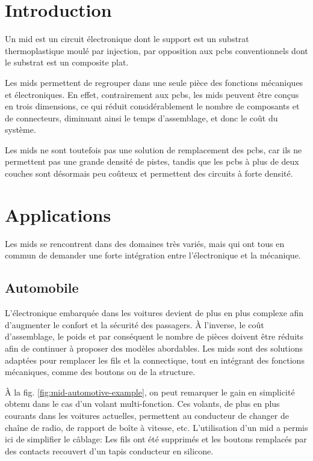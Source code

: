 \section{Introduction}
Un \gls{mid}  est un circuit électronique
dont le support est un substrat thermoplastique moulé par injection, par
opposition aux \glspl{pcb} conventionnels dont le substrat est un composite
plat.

Les \glspl{mid} permettent de regrouper dans une seule pièce des fonctions
mécaniques et électroniques. En effet, contrairement aux \glspl{pcb}, les
\glspl{mid} peuvent être conçus en trois dimensions, ce qui réduit
considérablement le nombre de composants et de connecteurs, diminuant ainsi le
temps d'assemblage, et donc le coût du système. 

Les \glspl{mid} ne sont toutefois pas une solution de remplacement des
\glspl{pcb}, car ils ne permettent pas une grande densité de pistes, tandis que
les \glspl{pcb} à plus de deux couches sont désormais peu coûteux et
permettent des circuits à forte densité.


\section{Applications}
Les \glspl{mid} se rencontrent dans des domaines très variés, mais qui ont tous en commun de demander une forte intégration entre l'électronique et la mécanique.

\subsection{Automobile}
L'électronique embarquée dans les voitures devient de plus en plus complexe afin d'augmenter le confort et la sécurité des passagers. 
À l'inverse, le coût d'assemblage, le poids et par conséquent le nombre de pièces doivent être réduits afin de continuer à proposer des modèles abordables.
Les \glspl{mid} sont des solutions adaptées pour remplacer les fils et la connectique, tout en intégrant des fonctions mécaniques, comme des boutons ou de la structure.

À la fig. \ref{fig:mid-automotive-example}, on peut remarquer le gain en simplicité obtenu dans le cas d'un volant multi-fonction.
Ces volants, de plus en plus courants dans les voitures actuelles, permettent au conducteur de changer de chaîne de radio, de rapport de boîte à vitesse, etc.
L'utilisation d'un \gls{mid} a permis ici de simplifier le câblage: Les fils ont été supprimés et les boutons remplacés par des contacts recouvert d'un tapis conducteur en silicone.

